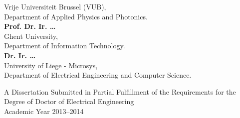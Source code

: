 \begin{tabbing}
\>\> \small Vrije Universiteit Brussel (VUB),\\
\>\> \small Department of Applied Physics and Photonics. \\
\> \textbf{Prof. Dr. Ir. \ldots } \\%
\>\> \small Ghent University,\\
\>\> \small Department of Information Technology. \\
\> \textbf{Dr. Ir. \ldots} \\%
\>\> \small University of Liege - Microsys,\\
\>\> \small Department of Electrical Engineering and Computer Science.
\end{tabbing}



\noindent\begin{center}\textsf{
A Dissertation Submitted in Partial Fulfillment of the
Requirements for the Degree of Doctor of Electrical Engineering \\
Academic Year 2013--2014
}
\end{center}


\par\vspace*{\fill}
\begin{minipage}{\textwidth}%
\hfill%
\hfill%
\hfill%
\hfill%
\end{minipage}\newpage

